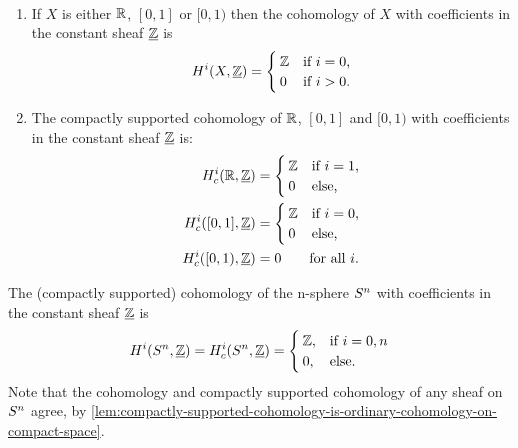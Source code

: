 \begin{cor}[name=\cref{cor:computation-cohomology-interval-real-line}]~  
\begin{enumerate}
        \item If $X$ is either $\mathbb{R}$, $[0,1]$ or $[0,1)$ then the cohomology of \(X\) with coefficients in the constant sheaf \(\underline{\mathbb{Z}}\) is $$\cohomology^i(X, \underline{\bb Z}) = \begin{cases}
            \bb Z & \text{if } i = 0\text{,} \\ 
            0 & \text{if } i>0\text{.}
        \end{cases}$$
        \item The compactly supported cohomology of \(\mathbb{R}\), \([0,1]\) and \([0,1)\) with coefficients in the constant sheaf \(\underline{\mathbb{Z}}\) is:
        \begin{align*}
            \cohomology^i_c(\bb R, \underline{\bb Z}) &= \begin{cases}
                \bb Z & \text{if } i = 1\text{,} \\
                0 & \text{else,}
            \end{cases} \\
            \cohomology^i_c([0,1], \underline{\bb Z}) &= \begin{cases}
                \bb Z & \text{if } i = 0\text{,} \\
                0 & \text{else,}
            \end{cases} \\
            \cohomology^i_c([0,1), \underline{\bb Z}) &= 0 \qquad \text{for all } i\text{.}
        \end{align*}
    \end{enumerate}
\end{cor}

\begin{prop}[name=Cohomology of the sphere]
    	The (compactly supported) cohomology of the n-sphere $\sphere^n$ with coefficients in the constant sheaf $\underline{\mathbb{Z}}$ is \[
        	\cohomology^i(\sphere^n, \underline{\bb Z}) = \cohomology_c^i(\sphere^n, \underline{\bb Z}) = \begin{cases}
            	\bb Z, & \text{if } i = 0,n\\
                0,&\text{else}.
            \end{cases}
        \] 
Note that the cohomology and compactly supported cohomology of any sheaf on $\sphere^n$ agree, by \cref{lem:compactly-supported-cohomology-is-ordinary-cohomology-on-compact-space}.
\end{prop}

